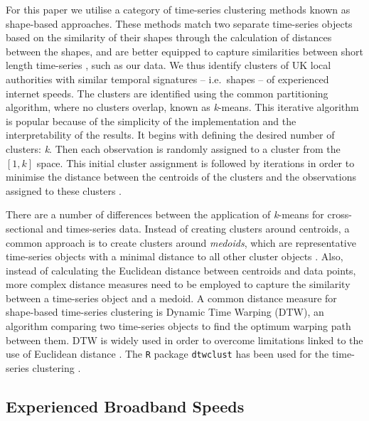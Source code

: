 \documentclass[Royal,times,sageh]{sagej}
\begin{document}
For this paper we utilise a category of time-series clustering methods
known as shape-based approaches. These methods match two separate
time-series objects based on the similarity of their shapes through the
calculation of distances between the shapes, and are better equipped to
capture similarities between short length time-series
\citep{aghabozorgi2015time}, such as our data. We thus identify clusters
of UK local authorities with similar temporal signatures -- i.e.~shapes
-- of experienced internet speeds. The clusters are identified using the
common partitioning algorithm, where no clusters overlap, known as
\emph{k}-means. This iterative algorithm is popular because of the
simplicity of the implementation and the interpretability of the
results. It begins with defining the desired number of clusters:
\emph{k}. Then each observation is randomly assigned to a cluster from
the \([1,k]\) space. This initial cluster assignment is followed by
iterations in order to minimise the distance between the centroids of
the clusters and the observations assigned to these clusters
\citep{james2013introduction}.

There are a number of differences between the application of
\emph{k}-means for cross-sectional and times-series data. Instead of
creating clusters around centroids, a common approach is to create
clusters around \emph{medoids}, which are representative time-series
objects with a minimal distance to all other cluster objects
\citep{sardatime}. Also, instead of calculating the Euclidean distance
between centroids and data points, more complex distance measures need
to be employed to capture the similarity between a time-series object
and a medoid. A common distance measure for shape-based time-series
clustering is Dynamic Time Warping (DTW), an algorithm comparing two
time-series objects to find the optimum warping path between them. DTW
is widely used in order to overcome limitations linked to the use of
Euclidean distance
\citep{sardatime, berndt1994using, ratanamahatana2004everything}. The
\texttt{R} package \texttt{dtwclust} has been used for the time-series
clustering \citep{dtwclust}.

\hypertarget{sec:3.2}{%
\subsection{Experienced Broadband Speeds}\label{sec:3.2}}
\end{document}
